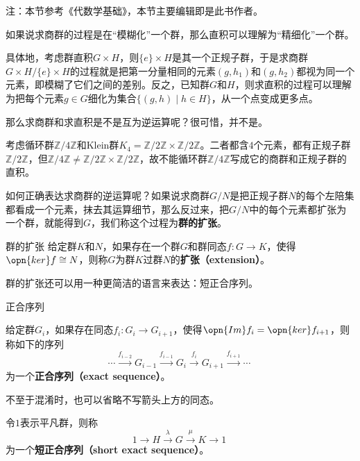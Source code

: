 


注：本节参考《代数学基础》，本节主要编辑即是此书作者。

如果说求商群的过程是在“模糊化”一个群，那么直积可以理解为“精细化”一个群。

具体地，考虑群直积$G\times H$，则$\{e\}\times H$是其一个正规子群，于是求商群$G\times H/\{e\}\times H$的过程就是把第一分量相同的元素$(g, h_1)$和$(g, h_2)$都视为同一个元素，即模糊了它们之间的差别。反之，已知群$G$和$H$，则求直积的过程可以理解为把每个元素$g\in G$细化为集合$\{(g, h)\mid h\in H\}$，从一个点变成更多点。


那么求商群和求直积是不是互为逆运算呢？很可惜，并不是。



\begin{example}{}
考虑循环群$\mathbb{Z}/4\mathbb{Z}$和Klein群$K_4=\mathbb{Z}/2\mathbb{Z}\times \mathbb{Z}/2\mathbb{Z}$。二者都含$4$个元素，都有正规子群$\mathbb{Z}/2\mathbb{Z}$，但$\mathbb{Z}/4\mathbb{Z}\neq \mathbb{Z}/2\mathbb{Z}\times \mathbb{Z}/2\mathbb{Z}$，故不能循环群$\mathbb{Z}/4\mathbb{Z}$写成它的商群和正规子群的直积。
\end{example}




如何正确表达求商群的逆运算呢？如果说求商群$G/N$是把正规子群$N$的每个左陪集都看成一个元素，抹去其运算细节，那么反过来，把$G/N$中的每个元素都扩张为一个群，就能得到$G$，我们称这个过程为\textbf{群的扩张}。



\begin{definition}{群的扩张}\label{def_GrpExt_1}
给定群$K$和$N$，如果存在一个群$G$和群同态$f:G\to K$，使得$\opn{ker}f\cong N$，则称$G$为群$K$过群$N$的\textbf{扩张（extension）}。
\end{definition}




群的扩张还可以用一种更简洁的语言来表达：短正合序列。



\begin{definition}{正合序列}

给定群$G_i$，如果存在同态$f_i:G_i\to G_{i+1}$，使得$\opn{Im}f_i=\opn{ker}f_{i+1}$，则称如下的序列
\begin{equation}
    \cdots \xrightarrow{f_{i-2}} G_{i-1} \xrightarrow{f_{i-1}} G_i \xrightarrow{f_i} G_{i+1} \xrightarrow{f_{i+1}}\cdots~
\end{equation}
为一个\textbf{正合序列（exact sequence）}。

不至于混淆时，也可以省略不写箭头上方的同态。

令$1$表示平凡群，则称
\begin{equation}
    1\xrightarrow{}H\xrightarrow{\lambda}G\xrightarrow{\mu}K\xrightarrow{}1~
\end{equation}
为一个\textbf{短正合序列（short exact sequence）}。

\end{definition}



